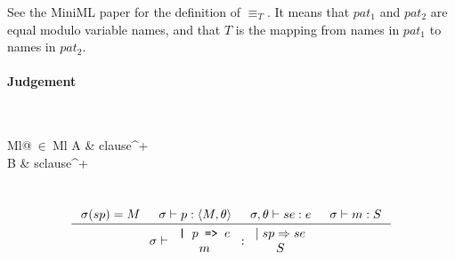 See the MiniML paper for the definition of $\equiv_T$. It means that $pat_1$ and $pat_2$
are equal modulo variable names, and that $T$ is the mapping from names in $pat_1$
to names in $pat_2$.

\clearpage

\paragraph{Judgement} \\
\indent\begin{tabular}{Ml@{$\ \in\ $}Ml}
  A & clause^{+}\\
  B & sclause^{+}
\end{tabular}\\

\[
\inference
{
  \sigma(sp) = M &
  \sigma |- p : \langle M, \theta \rangle &
  \sigma, \theta |- se : e &
  \sigma |- m : S
}
{
  \sigma |-
  \begin{tabular}{c}
    \texttt{| $p$ => $e$}\\
    $m$
  \end{tabular}
  :
  \begin{tabular}{c}
    $\mid sp => se$\\
    $S$
  \end{tabular}
}
\]




